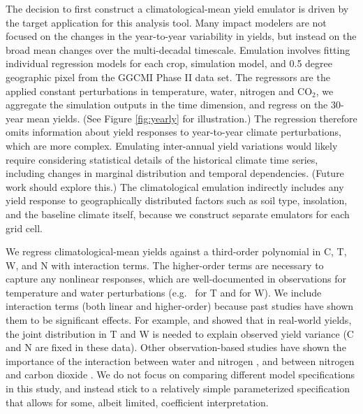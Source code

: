 \documentclass[preprint, 5p, times, twocolumn]{elsarticle}
\begin{document}
The decision to first construct a climatological-mean yield emulator is driven by the target application for this analysis tool. Many impact modelers are not focused on the changes in the year-to-year variability in yields, but instead on the broad mean changes over the multi-decadal timescale. Emulation involves fitting individual regression models for each crop, simulation model, and 0.5 degree geographic pixel from the GGCMI Phase II data set. The regressors are the applied constant perturbations in temperature, water, nitrogen and CO$_2$, we aggregate the simulation outputs in the time dimension, and regress on the 30-year mean yields. (See Figure \ref{fig:yearly} for illustration.) The regression therefore omits information about yield responses to year-to-year climate perturbations, which are more complex. Emulating inter-annual yield variations would likely require considering statistical details of the historical climate time series, including changes in marginal distribution and temporal dependencies. (Future work should explore this.) The climatological emulation indirectly includes any yield response to geographically distributed factors such as soil type, insolation, and the baseline climate itself, because we construct separate emulators for each grid cell. 

We regress climatological-mean yields against a third-order polynomial in C, T, W, and N with interaction terms. The higher-order terms are necessary to capture any nonlinear responses, which are well-documented in observations for temperature and water perturbations (e.g.\ \citet{Schlenker2009} for T and \citet{He2016} for W). We include interaction terms (both linear and higher-order)  because past studies have shown them to be significant effects. For example, \citet{Lobell2007} and \citet{Tebaldi2008} showed that in real-world yields, the joint distribution in T and W is needed to explain observed yield variance (C and N are fixed in these data). Other observation-based studies have shown the importance of the interaction between water and nitrogen \citep[e.g.\ ][]{AULAKH2005}, and between nitrogen and carbon dioxide \citep{Mitsuru92, Nakamura97}. We do not focus on comparing different model specifications in this study, and instead stick to a relatively simple parameterized specification that allows for some, albeit limited, coefficient interpretation.
\end{document}
